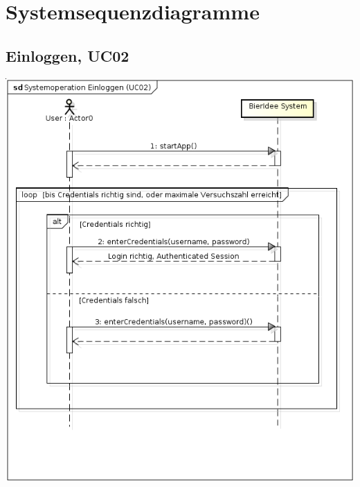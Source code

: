 \documentclass[10pt,a4paper]{scrartcl}
\begin{document}
\section{Systemsequenzdiagramme}
\subsection{Einloggen, UC02}
\includegraphics[width=\textwidth]{ssd.uc02.png}
\end{document}
